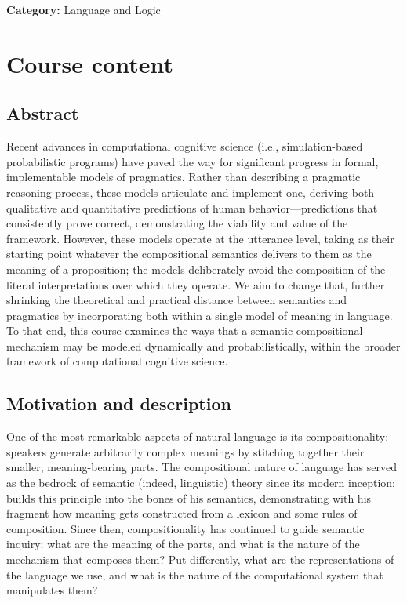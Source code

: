\documentclass[11pt]{article}
\begin{document}
\textbf{Category:} Language and Logic

\section{Course content}

\subsection{Abstract}

Recent advances in computational cognitive science (i.e., simulation-based probabilistic programs) have paved the way for significant progress in formal, implementable models of pragmatics. Rather than describing a pragmatic reasoning process, these models articulate and implement one, deriving both qualitative and quantitative predictions of human behavior---predictions that consistently prove correct, demonstrating the viability and value of the framework. However, these models operate at the utterance level, taking as their starting point whatever the compositional semantics delivers to them as the meaning of a proposition; the models deliberately avoid the composition of the literal interpretations over which they operate. We aim to change that, further shrinking the theoretical and practical distance between semantics and pragmatics by incorporating both within a single model of meaning in language. To that end, this course examines the ways that a semantic compositional mechanism may be modeled dynamically and probabilistically, within the broader framework of computational cognitive science.

\subsection{Motivation and description}

One of the most remarkable aspects of natural language is its compositionality: speakers generate arbitrarily complex meanings by stitching together their smaller, meaning-bearing parts. The compositional nature of language has served as the bedrock of semantic (indeed, linguistic) theory since its modern inception; \cite{montague1973} builds this principle into the bones of his semantics, demonstrating with his fragment how meaning gets constructed from a lexicon and some rules of composition. Since then, compositionality has continued to guide semantic inquiry: what are the meaning of the parts, and what is the nature of the mechanism that composes them? Put differently, what are the representations of the language we use, and what is the nature of the computational system that manipulates them?
\end{document}
